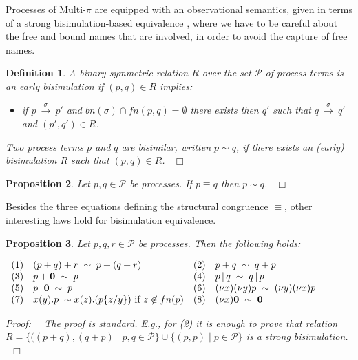 \documentclass[submission,copyright,creativecommons]{eptcs}
\newcommand{\fine}{{\mbox{ }\nolinebreak\hfill{$\Box$}}}
\newcommand{\sost}[2]{\mbox{$\{#1/#2\}$}}
\newcommand{\deriv}[1]{{\mbox{${\:\stackrel{#1}{\longrightarrow}\:}$}}}
\newcommand{\restr}[1]{\mbox{$({\bf\nu} #1)$}}
\newcommand{\para}{\mbox{$\,|\,$}}
\newcommand{\nil}{\mbox{\bf 0}}
\newtheorem{adefinition}{Definition}
\newtheorem{aproposition}[adefinition]{Proposition}
\newenvironment{definition}{\begin{adefinition}}{\end{adefinition}}
\newenvironment{proposition}{\begin{aproposition}}{\end{aproposition}}
\newcommand{\proof}{{\it Proof:}\ \ }
\begin{document}
Processes of Multi-$\pi$ are equipped with an observational semantics, given in terms of
a strong bisimulation-based equivalence \cite{Mil89}, where we have to be careful about 
the free and bound names that are
involved, in order to avoid the capture of free names. 

\begin{definition}
A binary symmetric relation $R$ over the set ${\mathcal P}$ of process terms is an {\em early bisimulation}
if
$(p,q)\in R$ implies:
\begin{itemize}
\item
if $p\deriv{\sigma}p'$ and $bn(\sigma)\cap fn(p,q) = \emptyset$
there exists then $q'$ such that
$q\deriv{\sigma}q'$ and $(p',q')\in R$.
\end{itemize}
Two process terms $p$ and $q$ are {\em bisimilar}, written
$p\sim q$, if there exists an (early) bisimulation $R$ such that $(p,q)\in R$.
\fine
\end{definition}

\begin{proposition}\label{prop1}
Let $p, q \in {\mathcal P}$ be processes. If $p \equiv q$ then $p \sim q$.
\fine
\end{proposition}

Besides the three equations defining the structural congruence $\equiv$, other interesting laws hold for
bisimulation equivalence.

\begin{proposition}\label{prop2}
Let $p, q, r \in {\mathcal P}$ be processes. Then the following holds:

$\begin{array}{llll}
(1) & (p + q) + r \; \sim \; p + (q +r)  &
(2) & p + q\; \sim \; q + p  \\
(3) & p + \nil \; \sim \;  p  &
(4) & p \para q\; \sim \; q \para p  \\
(5) & p \para \nil \; \sim \;  p  &
(6) & \restr{x}\restr{y}p \; \sim \;  \restr{y}\restr{x}p \\
(7) & x(y).p \; \sim x(z).(p\sost{z}{y}) \mbox{  if } z \not\in fn(p) &
(8) & \restr{x} \nil \; \sim \; \nil\\
\end{array}$

\proof 
The proof is standard. E.g., for (2) it is enough to prove that relation $R = \{ ((p+q),(q+p) \mid p,q \in   {\mathcal P} \} \cup 
\{ (p,p) \mid p \in  {\mathcal P} \} $ is a strong bisimulation.
\fine
\end{proposition}
\end{document}
